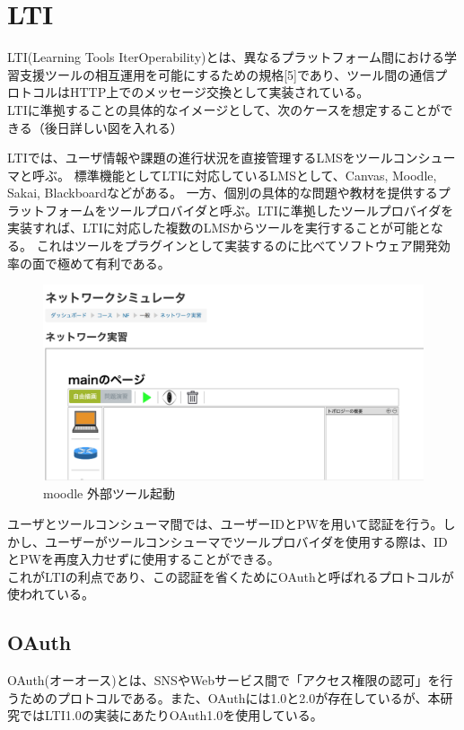 \section{LTI}\label{tag:LTI}
LTI(Learning Tools IterOperability)とは、異なるプラットフォーム間における学習支援ツールの相互運用を可能にするための規格[5]であり、ツール間の通信プロトコルはHTTP上でのメッセージ交換として実装されている。\\
LTIに準拠することの具体的なイメージとして、次のケースを想定することができる（後日詳しい図を入れる）

LTIでは、ユーザ情報や課題の進行状況を直接管理するLMSをツールコンシューマと呼ぶ。
標準機能としてLTIに対応しているLMSとして、Canvas, Moodle, Sakai, Blackboardなどがある。
一方、個別の具体的な問題や教材を提供するプラットフォームをツールプロバイダと呼ぶ。LTIに準拠したツールプロバイダを実装すれば、LTIに対応した複数のLMSからツールを実行することが可能となる。
これはツールをプラグインとして実装するのに比べてソフトウェア開発効率の面で極めて有利である。

\begin{figure}[htbp]
  \begin{center}
    \includegraphics[scale=0.2]{img/LTIstart.png}
    \caption{moodle 外部ツール起動}
    \label{fig:moodle kidou}
  \end{center}
\end{figure}

ユーザとツールコンシューマ間では、ユーザーIDとPWを用いて認証を行う。しかし、ユーザーがツールコンシューマでツールプロバイダを使用する際は、IDとPWを再度入力せずに使用することができる。\\
これがLTIの利点であり、この認証を省くためにOAuthと呼ばれるプロトコルが使われている。
\subsection{OAuth}
OAuth(オーオース)とは、SNSやWebサービス間で「アクセス権限の認可」を行うためのプロトコルである。また、OAuthには1.0と2.0が存在しているが、本研究ではLTI1.0の実装にあたりOAuth1.0を使用している。
